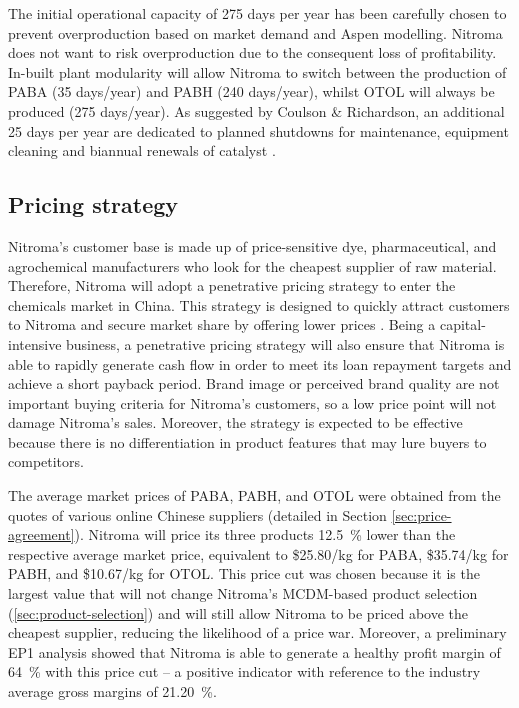 The initial operational capacity of 275 days per year has been carefully chosen to prevent overproduction based on market demand and Aspen modelling. Nitroma does not want to risk overproduction due to the consequent loss of profitability. In-built plant modularity will allow Nitroma to switch between the production of PABA (35 days/year) and PABH (240 days/year), whilst OTOL will always be produced (275 days/year). As suggested by Coulson \& Richardson, an additional 25 days per year are dedicated to planned shutdowns for maintenance, equipment cleaning and biannual renewals of catalyst \cite{sinnott_coulson_2005}. 

\subsection{Pricing strategy}
\label{sec:pricing-strategy}
Nitroma’s customer base is made up of price-sensitive dye, pharmaceutical, and agrochemical manufacturers who look for the cheapest supplier of raw material. Therefore, Nitroma will adopt a penetrative pricing strategy to enter the chemicals market in China. This strategy is designed to quickly attract customers to Nitroma and secure market share by offering lower prices \cite{corporate_finance_institute_penetrative_2021}. Being a capital-intensive business, a penetrative pricing strategy will also ensure that Nitroma is able to rapidly generate cash flow in order to meet its loan repayment targets and achieve a short payback period. Brand image or perceived brand quality are not important buying criteria for Nitroma’s customers, so a low price point will not damage Nitroma’s sales. Moreover, the strategy is expected to be effective because there is no differentiation in product features that may lure buyers to competitors.

The average market prices of PABA, PABH, and OTOL were obtained from the quotes of various online Chinese suppliers (detailed in Section \ref{sec:price-agreement}).  Nitroma will price its three products \SI{12.5}{\percent} lower than the respective average market price, equivalent to \$25.80/kg for PABA, \$35.74/kg for PABH, and \$10.67/kg for OTOL. This price cut was chosen because it is the largest value that will not change Nitroma’s MCDM-based product selection (\cref{sec:product-selection}) and will still allow Nitroma to be priced above the cheapest supplier, reducing the likelihood of a price war. Moreover, a preliminary EP1 analysis showed that Nitroma is able to generate a healthy profit margin of \SI{64}{\percent} with this price cut – a positive indicator with reference to the industry average gross margins of \SI{21.20}{\percent}. 

